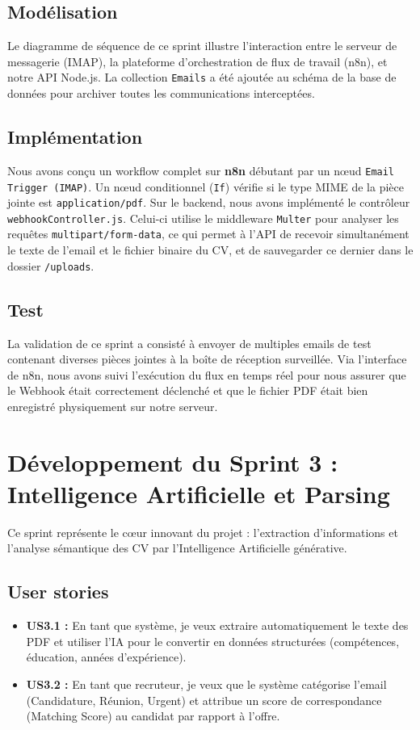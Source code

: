 \subsection{Modélisation}
Le diagramme de séquence de ce sprint illustre l'interaction entre le serveur de messagerie (IMAP), la plateforme d'orchestration de flux de travail (n8n), et notre API Node.js. La collection \texttt{Emails} a été ajoutée au schéma de la base de données pour archiver toutes les communications interceptées.

\subsection{Implémentation}
Nous avons conçu un workflow complet sur \textbf{n8n} débutant par un nœud \texttt{Email Trigger (IMAP)}. Un nœud conditionnel (\texttt{If}) vérifie si le type MIME de la pièce jointe est \texttt{application/pdf}. 
Sur le backend, nous avons implémenté le contrôleur \texttt{webhookController.js}. Celui-ci utilise le middleware \texttt{Multer} pour analyser les requêtes \texttt{multipart/form-data}, ce qui permet à l'API de recevoir simultanément le texte de l'email et le fichier binaire du CV, et de sauvegarder ce dernier dans le dossier \texttt{/uploads}.

\subsection{Test}
La validation de ce sprint a consisté à envoyer de multiples emails de test contenant diverses pièces jointes à la boîte de réception surveillée. Via l'interface de n8n, nous avons suivi l'exécution du flux en temps réel pour nous assurer que le Webhook était correctement déclenché et que le fichier PDF était bien enregistré physiquement sur notre serveur.

\section{Développement du Sprint 3 : Intelligence Artificielle et Parsing}
Ce sprint représente le cœur innovant du projet : l'extraction d'informations et l'analyse sémantique des CV par l'Intelligence Artificielle générative.

\subsection{User stories}
\begin{itemize}
    \item \textbf{US3.1 :} En tant que système, je veux extraire automatiquement le texte des PDF et utiliser l'IA pour le convertir en données structurées (compétences, éducation, années d'expérience).
    \item \textbf{US3.2 :} En tant que recruteur, je veux que le système catégorise l'email (Candidature, Réunion, Urgent) et attribue un score de correspondance (Matching Score) au candidat par rapport à l'offre.
\end{itemize}

